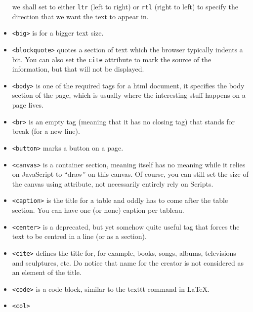 \documentclass[oneside, 12pt]{article}
\newcommand{\itemm}[1]{\item \texttt{#1}}
\begin{document}
\begin{itemize}
	we shall set to either \texttt{ltr} (left to right) or \texttt{rtl} (right to left) to specify the
	direction that we want the text to appear in. 
	\itemm{<big>} is for a bigger text size.
	\itemm{<blockquote>} quotes a section of text which the browser typically indents a bit. You can
	also set the \texttt{cite} attribute to mark the source of the information, but that will not be
	displayed. 
	\itemm{<body>} is one of the required tags for a html document, it specifies the body section of
	the page, which is usually where the interesting stuff happens on a page lives.
	\itemm{<br>} is an empty tag (meaning that it has no closing tag) that stands for break (for a new line).
	\itemm{<button>} marks a button on a page.
	\itemm{<canvas>} is a container section, meaning itself has no meaning while it relies on JavaScript
	to ``draw'' on this canvas. Of course, you can still set the size of the canvas using attribute, 
	not necessarily entirely rely on Scripts.
	\itemm{<caption>} is the title for a table and oddly has to come after the table section. You can have
	one (or none) caption per tableau. 
	\itemm{<center>} is a deprecated, but yet somehow quite useful tag that forces the text to be
	centred in a line (or as a section). 
	\itemm{<cite>} defines the title for, for example, books, songs, albums, televisions and sculptures, etc.
	Do notice that name for the creator is not considered as an element of the title.
	\itemm{<code>} is a code block, similar to the texttt command in \LaTeX.
	\itemm{<col>} 
\end{itemize}
\end{document}
